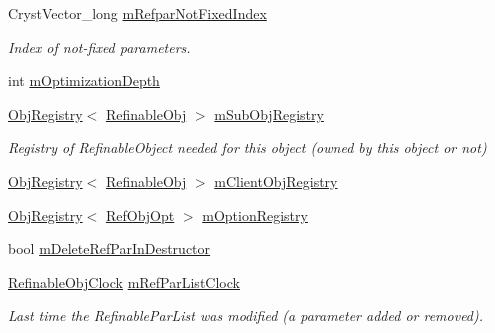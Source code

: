 \begin{DoxyCompactItemize}
Cryst\+Vector\+\_\+long \mbox{\hyperlink{class_obj_cryst_1_1_refinable_obj_a359f6599fdaa11ea01afd91289265bac}{m\+Refpar\+Not\+Fixed\+Index}}
\begin{DoxyCompactList}\small\item\em Index of not-\/fixed parameters. \end{DoxyCompactList}\item 
int \mbox{\hyperlink{class_obj_cryst_1_1_refinable_obj_a920ae46a7d90f940866d35b7548d77a8}{m\+Optimization\+Depth}}
\item 
\mbox{\label{class_obj_cryst_1_1_refinable_obj_a101ff2559ab840729c8cbc7b2469afd6}} 
\mbox{\hyperlink{class_obj_cryst_1_1_obj_registry}{Obj\+Registry}}$<$ \mbox{\hyperlink{class_obj_cryst_1_1_refinable_obj}{Refinable\+Obj}} $>$ \mbox{\hyperlink{class_obj_cryst_1_1_refinable_obj_a101ff2559ab840729c8cbc7b2469afd6}{m\+Sub\+Obj\+Registry}}
\begin{DoxyCompactList}\small\item\em Registry of Refinable\+Object needed for this object (owned by this object or not) \end{DoxyCompactList}\item 
\mbox{\hyperlink{class_obj_cryst_1_1_obj_registry}{Obj\+Registry}}$<$ \mbox{\hyperlink{class_obj_cryst_1_1_refinable_obj}{Refinable\+Obj}} $>$ \mbox{\hyperlink{class_obj_cryst_1_1_refinable_obj_abe0324d0b4bbd15ee9134412b98f55c3}{m\+Client\+Obj\+Registry}}
\item 
\mbox{\hyperlink{class_obj_cryst_1_1_obj_registry}{Obj\+Registry}}$<$ \mbox{\hyperlink{class_obj_cryst_1_1_ref_obj_opt}{Ref\+Obj\+Opt}} $>$ \mbox{\hyperlink{class_obj_cryst_1_1_refinable_obj_a85a478e7564d71102aedf7c3e81f56d0}{m\+Option\+Registry}}
\item 
bool \mbox{\hyperlink{class_obj_cryst_1_1_refinable_obj_a8e3295302c9a1f9ea29f1749132e561b}{m\+Delete\+Ref\+Par\+In\+Destructor}}
\item 
\mbox{\label{class_obj_cryst_1_1_refinable_obj_a867562fcd8c5afd0fd178c98729e1f35}} 
\mbox{\hyperlink{class_obj_cryst_1_1_refinable_obj_clock}{Refinable\+Obj\+Clock}} \mbox{\hyperlink{class_obj_cryst_1_1_refinable_obj_a867562fcd8c5afd0fd178c98729e1f35}{m\+Ref\+Par\+List\+Clock}}
\begin{DoxyCompactList}\small\item\em Last time the Refinable\+Par\+List was modified (a parameter added or removed). \end{DoxyCompactList}\item 

\end{DoxyCompactItemize}
